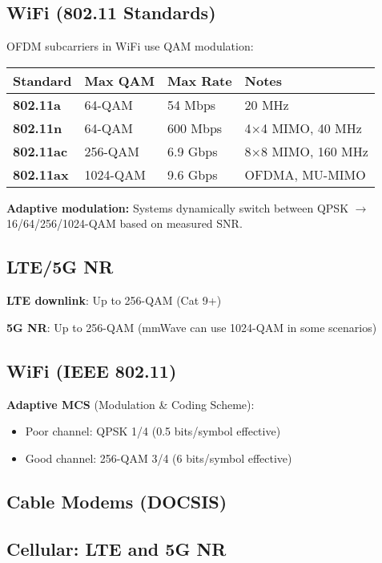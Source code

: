 \subsection{WiFi (802.11 Standards)}

OFDM subcarriers in WiFi use QAM modulation:

{\def\LTcaptype{} %
\begin{longtable}[]{@{}llll@{}}
\toprule\noalign{}
Standard & Max QAM & Max Rate & Notes \\
\midrule\noalign{}
\endhead
\bottomrule\noalign{}
\endlastfoot
\textbf{802.11a} & 64-QAM & 54 Mbps & 20 MHz \\
\textbf{802.11n} & 64-QAM & 600 Mbps & 4$\times$4 MIMO, 40 MHz \\
\textbf{802.11ac} & 256-QAM & 6.9 Gbps & 8$\times$8 MIMO, 160 MHz \\
\textbf{802.11ax} & 1024-QAM & 9.6 Gbps & OFDMA, MU-MIMO \\
\end{longtable}
}

\textbf{Adaptive modulation:} Systems dynamically switch between QPSK $\rightarrow$ 16/64/256/1024-QAM based on measured SNR.

\subsection{LTE/5G NR}

\textbf{LTE downlink}: Up to 256-QAM (Cat 9+)

\textbf{5G NR}: Up to 256-QAM (mmWave can use 1024-QAM in some
scenarios)

\subsection{WiFi (IEEE 802.11)}

\textbf{Adaptive MCS} (Modulation \& Coding Scheme):
\begin{itemize}
\item Poor channel: QPSK 1/4 (0.5 bits/symbol effective)
\item Good channel: 256-QAM 3/4 (6 bits/symbol effective)
\end{itemize}

\subsection{Cable Modems (DOCSIS)}

\subsection{Cellular: LTE and 5G NR}

